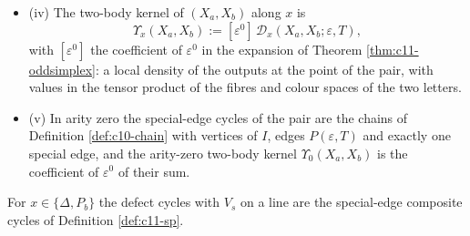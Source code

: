 \begin{definition}
\begin{itemize}
\[\]
with $\{-,-\}_{H^m}$ the bracket of \eqref{eq:c10-finitesp}: the coefficient of $\varepsilon^0$ of the special-edge parts of the counterterm brackets $-\{I,\mathrm{ct}^{(1)}_x(X_aX_b)[\varepsilon]\}_\varepsilon$ and $-\{S^{(1)}(x),\partial_\delta I^{CT}[\varepsilon](X_aX_b)\}_\varepsilon$. It is cancelled in the components by the graphs with the special edge on a bridge (Theorem \ref{thm:c11-classes} (ii)); the two-body kernel is the coefficient of $\varepsilon^0$ of the defect cycles alone.
\item (iv) The two-body kernel of $(X_a,X_b)$ along $x$ is
\[
\Upsilon_x(X_a,X_b):=[\varepsilon^0]\,\mathcal D_x(X_a,X_b;\varepsilon,T),
\]
with $[\varepsilon^0]$ the coefficient of $\varepsilon^0$ in the expansion of Theorem \ref{thm:c11-oddsimplex}: a local density of the outputs at the point of the pair, with values in the tensor product of the fibres and colour spaces of the two letters.
\item (v) In arity zero the special-edge cycles of the pair are the chains of Definition \ref{def:c10-chain} with vertices of $I$, edges $P(\varepsilon,T)$ and exactly one special edge, and the arity-zero two-body kernel $\Upsilon_0(X_a,X_b)$ is the coefficient of $\varepsilon^0$ of their sum.
\end{itemize}
For $x\in\{\Delta,P_b\}$ the defect cycles with $V_s$ on a line are the special-edge composite cycles of Definition \ref{def:c11-sp}.
\end{definition}

